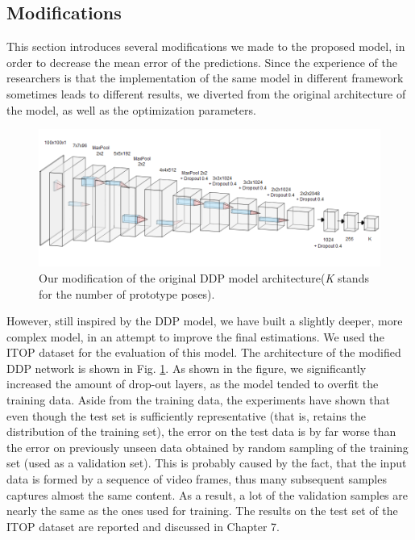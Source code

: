 \subsection{Modifications}
This section introduces several modifications we made to the proposed model, in order to decrease the mean error of the predictions. Since the experience of the researchers is that the implementation of the same model in different framework sometimes leads to different results, we diverted from the original architecture of the model, as well as the optimization parameters.\par
\vspace{5mm}
\begin{figure}[H]
\begin{center}
  \includegraphics[width=\textwidth]{images/implementation/mddp.png}
  \caption[Our modification of the original DDP model architecture.]{Our modification of the original DDP model architecture\break (\textit{K} stands for the number of prototype poses).}
  \label{fig:mddp}
\end{center}
\end{figure}

\noindent
However, still inspired by the DDP model, we have built a slightly deeper, more complex model, in an attempt to improve the final estimations. We used the ITOP dataset for the evaluation of this model.
The architecture of the modified DDP network is shown in Fig. \ref{fig:mddp}. As shown in the figure, we significantly increased the amount of drop-out layers, as the model tended to overfit the training data. Aside from the training data, the experiments have shown that even though the test set is sufficiently representative (that is, retains the distribution of the training set), the error on the test data is by far worse than the error on previously unseen data obtained by random sampling of the training set (used as a validation set). This is probably caused by the fact, that the input data is formed by a sequence of video frames, thus many subsequent samples captures almost the same content. As a result, a lot of the validation samples are nearly the same as the ones used for training. The results on the test set of the ITOP dataset are reported and discussed in Chapter 7.



